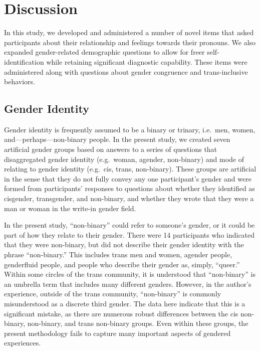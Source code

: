 \documentclass[12pt,twoside]{reedthesis}
\begin{document}
\hypertarget{discussion}{%
\chapter{Discussion}\label{discussion}}

In this study, we developed and administered a number of novel items that asked participants about their relationship and feelings towards their pronouns. We also expanded gender-related demographic questions to allow for freer self-identification while retaining significant diagnostic capability. These items were administered along with questions about gender congruence and trans-inclusive behaviors.

\hypertarget{gender-identity-1}{%
\section{Gender Identity}\label{gender-identity-1}}

Gender identity is frequently assumed to be a binary or trinary, i.e.~men, women, and---perhaps---non-binary people. In the present study, we created seven artificial gender groups based on answers to a series of questions that disaggregated gender identity (e.g.~woman, agender, non-binary) and mode of relating to gender identity (e.g.~cis, trans, non-binary). These groups are artificial in the sense that they do not fully convey any one participant's gender and were formed from participants' responses to questions about whether they identified as cisgender, transgender, and non-binary, and whether they wrote that they were a man or woman in the write-in gender field.

In the present study, ``non-binary'' could refer to someone's gender, or it could be part of how they relate to their gender. There were 14 participants who indicated that they were non-binary, but did not describe their gender identity with the phrase ``non-binary.'' This includes trans men and women, agender people, genderfluid people, and people who describe their gender as, simply, ``queer.'' Within some circles of the trans community, it is understood that ``non-binary'' is an umbrella term that includes many different genders. However, in the author's experience, outside of the trans community, ``non-binary'' is commonly misunderstood as a discrete third gender. The data here indicate that this is a significant mistake, as there are numerous robust differences between the cis non-binary, non-binary, and trans non-binary groups. Even within these groups, the present methodology fails to capture many important aspects of gendered experiences.
\end{document}
